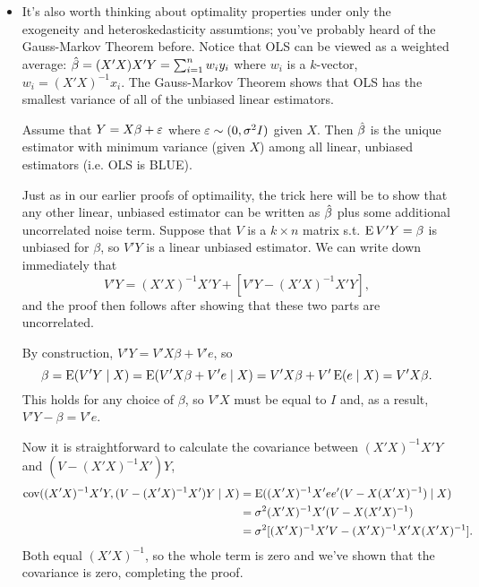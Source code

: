 \begin{itemize}
\item It's also worth thinking about optimality properties under only
  the exogeneity and heteroskedasticity assumtions; you've probably
  heard of the Gauss-Markov Theorem before.  Notice that OLS can be
  viewed as a weighted average: $\hat{\beta} = (X'X) X'Y = \sum_{i=1}^n w_i y_i$
  where $w_i$ is a $k$-vector, $w_i = (X'X)^{-1} x_i$.  The
  Gauss-Markov Theorem shows that OLS has the smallest variance of all
  of the unbiased linear estimators.
  \begin{thm}
    Assume that $Y = X\beta + \varepsilon$ where $\varepsilon \sim (0, \sigma^2 I)$ given $X$.
    Then $\hat{\beta}$ is the unique estimator with minimum variance (given
    $X$) among all linear, unbiased estimators (i.e. OLS is BLUE).
  \end{thm}

  Just as in our earlier proofs of optimaility, the trick here will be
  to show that any other linear, unbiased estimator can be written as
  $\hat{\beta}$ plus some additional uncorrelated noise term.  Suppose that
  $V$ is a $k \times n$ matrix s.t. $\operatorname{E} V'Y = \beta$ is unbiased for $\beta$, so
  $V'Y$ is a linear unbiased estimator.  We can write down immediately
  that
  \begin{equation*}
    V'Y = (X'X)^{-1}X'Y + [V'Y - (X'X)^{-1} X'Y],
  \end{equation*}
  and the proof then follows after showing that these two parts are
  uncorrelated.
  
  By construction, $V'Y = V'X\beta + V'e$, so
  \begin{equation*}
    \beta = \operatorname{E}(V'Y \mid X) = \operatorname{E}(V'X\beta + V'e \mid X) = V'X \beta + V'\operatorname{E}(e \mid X) = V'X\beta.
  \end{equation*}
  This holds for any choice of $\beta$, so $V'X$ must be equal to $I$ and,
  as a result, $V'Y - \beta = V'e$.

  Now it is straightforward to calculate the covariance between
  $(X'X)^{-1}X'Y$ and $(V - (X'X)^{-1}X')Y$,
  \begin{align*}
    \operatorname{cov}((X'X)^{-1}X'Y, (V - (X'X)^{-1}X')Y \mid X)
    &= \operatorname{E}((X'X)^{-1}X'e e'(V - X(X'X)^{-1}) \mid X) \\
    &= \sigma^2 (X'X)^{-1}X'(V - X(X'X)^{-1}) \\
    &= \sigma^2 [(X'X)^{-1}X'V - (X'X)^{-1} X'X (X'X)^{-1}].
  \end{align*}
  Both equal $(X'X)^{-1}$, so the whole term is zero and we've shown
  that the covariance is zero, completing the proof.


\end{itemize}
